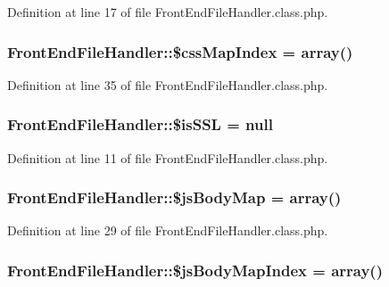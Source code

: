 Definition at line 17 of file Front\-End\-File\-Handler.\-class.\-php.

\hypertarget{classFrontEndFileHandler_a61df1d725cd1884fd0a260dec738a4b7}{
\subsubsection[{\$css\-Map\-Index}]{\setlength{\rightskip}{0pt plus 5cm}Front\-End\-File\-Handler\-::\$css\-Map\-Index = array()}}\label{classFrontEndFileHandler_a61df1d725cd1884fd0a260dec738a4b7}


Definition at line 35 of file Front\-End\-File\-Handler.\-class.\-php.

\hypertarget{classFrontEndFileHandler_a1e709934ab4023d10850268064d771bc}{
\subsubsection[{\$is\-S\-S\-L}]{\setlength{\rightskip}{0pt plus 5cm}Front\-End\-File\-Handler\-::\$is\-S\-S\-L = null\hspace{0.3cm}{\ttfamily [static]}}}\label{classFrontEndFileHandler_a1e709934ab4023d10850268064d771bc}


Definition at line 11 of file Front\-End\-File\-Handler.\-class.\-php.

\hypertarget{classFrontEndFileHandler_ad03de614a088bc386c393543a3cd9aed}{
\subsubsection[{\$js\-Body\-Map}]{\setlength{\rightskip}{0pt plus 5cm}Front\-End\-File\-Handler\-::\$js\-Body\-Map = array()}}\label{classFrontEndFileHandler_ad03de614a088bc386c393543a3cd9aed}


Definition at line 29 of file Front\-End\-File\-Handler.\-class.\-php.

\hypertarget{classFrontEndFileHandler_aba61415d3f993f1f6b9cddc0024f50b1}{
\subsubsection[{\$js\-Body\-Map\-Index}]{\setlength{\rightskip}{0pt plus 5cm}Front\-End\-File\-Handler\-::\$js\-Body\-Map\-Index = array()}}\label{classFrontEndFileHandler_aba61415d3f993f1f6b9cddc0024f50b1}


